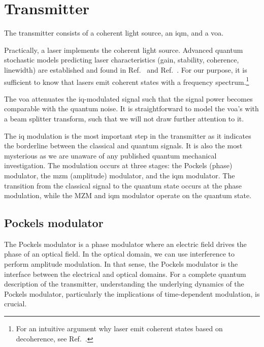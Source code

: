 \section{Transmitter}

The transmitter consists of a coherent light source, an \gls{iqm}, and a \gls{voa}.

Practically, a laser implements the coherent light source.
Advanced quantum stochastic models predicting laser characteristics (gain, stability, coherence, linewidth) are established and found in  Ref.~\cite[p.~900]{Mandel1995} and Ref.~\cite{Haken2012}.
For our purpose, it is sufficient to know that lasers emit coherent states with a frequency spectrum.\footnote{For an intuitive argument why laser emit coherent states based on decoherence, see Ref.~\cite{Gea1998}.}

The \gls{voa} attenuates the \gls{iq}-modulated signal such that the signal power becomes comparable with the quantum noise.
It is straightforward to model the \gls{voa}'s with a beam splitter transform, such that we will not draw further attention to it.

The \gls{iq} modulation is the most important step in the transmitter as it indicates the borderline between the classical and quantum signals.
It is also the most mysterious as we are unaware of any published quantum mechanical investigation.
The modulation occurs at three stages: the Pockels (phase) modulator, the \gls{mzm} (amplitude) modulator, and the \gls{iqm} modulator.
The transition from the classical signal to the quantum state occurs at the phase modulation, while the MZM and \gls{iqm} modulator operate on the quantum state.

\FloatBarrier
\subsection{Pockels modulator}

The Pockels modulator is a phase modulator where an electric field drives the phase of an optical field.
In the optical domain, we can use interference to perform amplitude modulation.
In that sense, the Pockels modulator is the interface between the electrical and optical domains.
For a complete quantum description of the transmitter, understanding the underlying dynamics of the Pockels modulator, particularly the implications of time-dependent modulation, is crucial.

